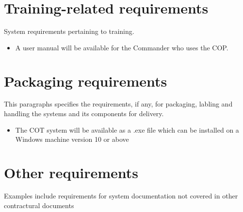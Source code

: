 \section{Training-related requirements}
System requirements pertaining to training.

\begin{itemize}
	\item A user manual will be available for the Commander who uses the COP. 	
\end{itemize}




\section{Packaging requirements}
This paragraphs specifies the requirements, if any, for packaging, labling and handling the systems and its components for delivery.

\begin{itemize}
	\item The COT system will be available as a .exe file which can be installed on a Windows machine version 10 or above
\end{itemize}

\section{Other requirements}
Examples include requirements for system documentation
not covered in other contractural documents